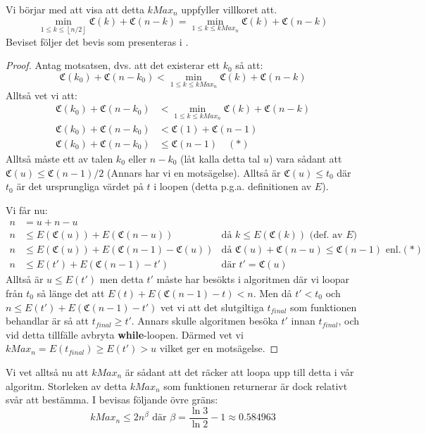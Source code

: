 \documentclass[a4paper,titlepage]{article}
\providecommand{\floor}[1]{\left \lfloor #1 \right \rfloor }
\newcommand{\C}[1]{\mathfrak C \left( #1 \right)}
\theoremstyle{definition}
\begin{document}
    Vi börjar med att visa att detta $kMax_n$ uppfyller villkoret att.
    $$\min_{1 \leq k \leq \floor{n/2}} \C{k} + \C{n-k} = \min_{1 \leq k \leq
    kMax_n} \C{k} + \C{n-k}$$
    Beviset följer det bevis som presenteras i \cite{algorithm_lune}.
    \begin{proof}
        Antag motsatsen, dvs. att det existerar ett $k_0$ så att:
        $$\C{k_0} + \C{n-k_0} < \min_{1 \leq k \leq kMax_n} \C{k} + \C{n-k}$$
        Alltså vet vi att:
        \begin{align*}
            \C{k_0} + \C{n-k_0} &< \min_{1 \leq k \leq kMax_n} \C{k} + \C{n-k} \\
            \C{k_0} + \C{n-k_0} &< \C{1} + \C{n-1} \\
            \C{k_0} + \C{n-k_0} &\le \C{n-1} \quad (*)
        \end{align*}
        Alltså måste ett av talen $k_0$ eller $n-k_0$ (låt kalla detta tal $u$)
        vara sådant att $\C{u} \le \C{n-1}/2$ (Annars har vi en motsägelse).
        Alltså är $\C{u}\le t_0$ där $t_0$ är det ursprungliga värdet på $t$ i
        loopen (detta p.g.a. definitionen av $E$). 
        
        Vi får nu:
        \begin{align*}
            n &= u + n-u & \\
            n &\le E(\C{u})+E(\C{n-u}) & \text{då $k\le E(\C{k})$ (def. av $E$)}\\
            n &\le E(\C{u})+E(\C{n-1}-\C{u}) & \text{då } \C{u}+\C{n-u}\le
            \C{n-1} \text{ enl.} (*) \\
            n &\le E(t')+E(\C{n-1}-t') & \text{där } t' = \C{u} 
        \end{align*}
        Alltså är $u\le E(t')$ men detta $t'$ måste har besökts i algoritmen där
        vi loopar från $t_0$ så länge det att $E(t)+E(\C{n-1}-t) < n$. Men då $t' <
        t_0$ och $n \le E(t')+E(\C{n-1}-t')$ vet vi att det slutgiltiga $t_{final}$ som
        funktionen behandlar är så att  $t_{final} \ge t'$. Annars skulle
        algoritmen besöka $t'$ innan $t_{final}$, och vid detta tillfälle
        avbryta \textbf{while}-loopen. 
        Därmed vet vi $kMax_n = E(t_{final}) \ge E(t') > u$ vilket ger en motsägelse.
    \end{proof}

    Vi vet alltså nu att $kMax_n$ är sådant att det räcker att loopa upp till
    detta i vår algoritm.
    Storleken av detta $kMax_n$ som funktionen returnerar är dock relativt svår att
    bestämma. I \cite{algorithm_lune} bevisas följande övre gräns:
    $$ kMax_n \le 2n^\beta \text{ där } \beta = \frac{\ln 3}{\ln 2} - 1 \approx
    0.584963$$
\end{document}
